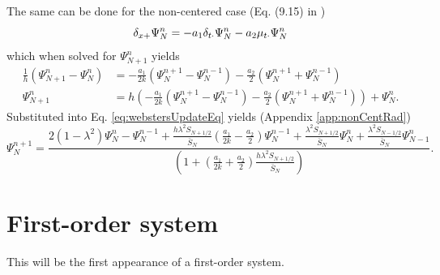 The same can be done for the non-centered case (Eq. (9.15) in \cite{theBible})
\begin{equation}\label{eq:nonCentRadBound}
    \delta_{x+}\Psi_N^n = -a_1\delta_{t\cdot}\Psi_N^n - a_2\mu_{t\cdot}\Psi_N^n
\end{equation}
which when solved for $\Psi_{N+1}^n$ yields
\begin{align}
    \frac{1}{h}(\Psi_{N+1}^n - \Psi_{N}^n) &= -\frac{a_1}{2k}(\Psi_N^{n+1} - \Psi_N^{n-1}) - \frac{a_2}{2}(\Psi_N^{n+1} + \Psi_N^{n-1})\nonumber\\
        \Psi_{N+1}^n &= h\left(-\frac{a_1}{2k}(\Psi_N^{n+1} - \Psi_N^{n-1}) - \frac{a_2}{2}(\Psi_N^{n+1} + \Psi_N^{n-1})\right) + \Psi_{N}^n.
\end{align}
Substituted into Eq. \eqref{eq:webstersUpdateEq} yields (Appendix \ref{app:nonCentRad})
\begin{equation}
    \Psi_N^{n+1} = \frac{2(1-\lambda^2)\Psi_N^n-\Psi_N^{n-1}+\frac{h\lambda^2S_{N+1/2}}{\bar S_N}\left(\frac{a_1}{2k}-\frac{a_2}{2}\right)\Psi_N^{n-1} + \frac{\lambda^2S_{N+1/2}}{\bar S_N}\Psi_{N}^n + \frac{\lambda^2S_{N-1/2}}{\bar S_N}\Psi_{N-1}^n}{\left(1+\left(\frac{a_1}{2k}+\frac{a_2}{2}\right)\frac{h\lambda^2S_{N+1/2}}{\bar S_N}\right)}.
\end{equation}

\section{First-order system}

This will be the first appearance of a first-order system. 

